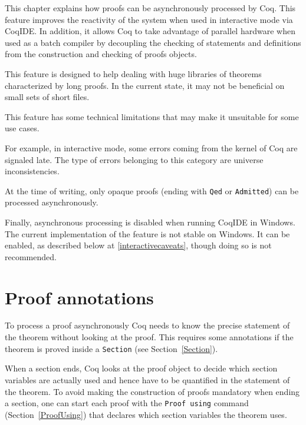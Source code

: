 
\label{pralitp}

This chapter explains how proofs can be asynchronously processed by Coq.
This feature improves the reactivity of the system when used in interactive
mode via CoqIDE. In addition, it allows Coq to take advantage of
parallel hardware when used as a batch compiler by decoupling the checking
of statements and definitions from the construction and checking of proofs
objects.

This feature is designed to help dealing with huge libraries of theorems
characterized by long proofs. In the current state, it may not be beneficial
on small sets of short files.

This feature has some technical limitations that may make it unsuitable for
some use cases.

For example, in interactive mode, some errors coming from the kernel of Coq
are signaled late.  The type of errors belonging to this category
are universe inconsistencies.

At the time of writing, only opaque proofs (ending with \texttt{Qed} or \texttt{Admitted}) can be processed asynchronously.

Finally, asynchronous processing is disabled when running CoqIDE in Windows. The
current implementation of the feature is not stable on Windows. It can be
enabled, as described below at \ref{interactivecaveats}, though doing so is not
recommended.

\section{Proof annotations}

To process a proof asynchronously Coq needs to know the precise statement
of the theorem without looking at the proof.  This requires some annotations
if the theorem is proved inside a \texttt{Section} (see Section~\ref{Section}).

When a section ends, Coq looks at the proof object to decide which
section variables are actually used and hence have to be quantified in the
statement of the theorem.  To avoid making the construction of proofs
mandatory when ending a section, one can start each proof with the
\texttt{Proof using} command (Section~\ref{ProofUsing}) that declares which
section variables the theorem uses.

